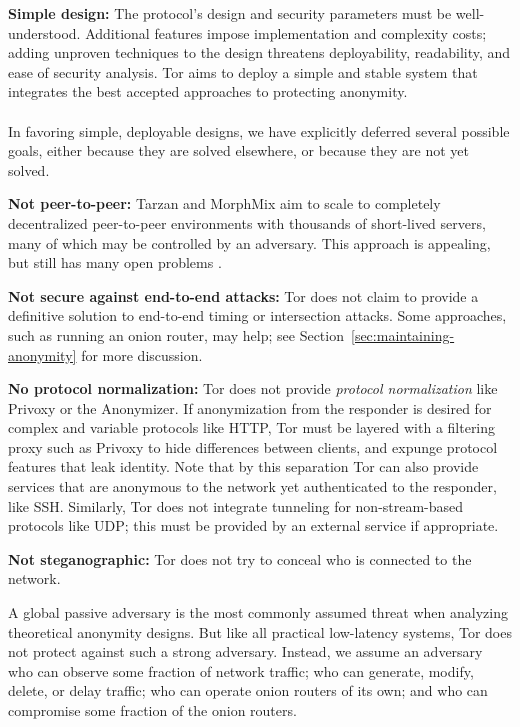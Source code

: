 \documentclass[times,10pt,twocolumn]{article}
\begin{document}
\textbf{Simple design:} The protocol's design and security
parameters must be well-understood. Additional features impose implementation
and complexity costs; adding unproven techniques to the design threatens
deployability, readability, and ease of security analysis. Tor aims to
deploy a simple and stable system that integrates the best accepted
approaches to protecting anonymity.\\

\label{subsec:non-goals}\\
In favoring simple, deployable designs, we have explicitly deferred
several possible goals, either because they are solved elsewhere, or because
they are not yet solved.

\textbf{Not peer-to-peer:} Tarzan and MorphMix aim to scale to completely
decentralized peer-to-peer environments with thousands of short-lived
servers, many of which may be controlled by an adversary.  This approach
is appealing, but still has many open problems
\cite{tarzan:ccs02,morphmix:fc04}.

\textbf{Not secure against end-to-end attacks:} Tor does not claim
to provide a definitive solution to end-to-end timing or intersection
attacks. Some approaches, such as running an onion router, may help;
see Section~\ref{sec:maintaining-anonymity} for more discussion.

\textbf{No protocol normalization:} Tor does not provide \emph{protocol
normalization} like Privoxy or the Anonymizer. If anonymization from
the responder is desired for complex and variable
protocols like HTTP, Tor must be layered with a filtering proxy such
as Privoxy to hide differences between clients, and expunge protocol
features that leak identity.
Note that by this separation Tor can also provide services that
are anonymous to the network yet authenticated to the responder, like
SSH. Similarly, Tor does not integrate
tunneling for non-stream-based protocols like UDP; this must be
provided by an external service if appropriate.

\textbf{Not steganographic:} Tor does not try to conceal who is connected
to the network.

\label{subsec:threat-model}

A global passive adversary is the most commonly assumed threat when
analyzing theoretical anonymity designs. But like all practical
low-latency systems, Tor does not protect against such a strong
adversary. Instead, we assume an adversary who can observe some fraction
of network traffic; who can generate, modify, delete, or delay
traffic;  who can operate onion routers of its own; and who can
compromise some fraction of the onion routers.
\end{document}
